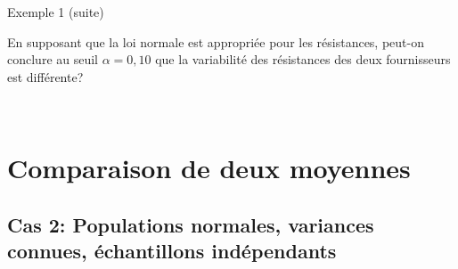 \documentclass{BeamerTemplate}
\begin{document}
\begin{frame}[t]{Exemple 1 (suite)}

En supposant que la loi normale est appropriée pour les résistances, peut-on conclure au seuil $\alpha = 0,10$ que la variabilité des résistances des deux fournisseurs est différente?

{\ }
\end{frame}



\section[Comparer 2 moyennes]{Comparaison de deux moyennes}

\subsection{Cas 2: Populations normales, variances connues, échantillons indépendants}
\end{document}
